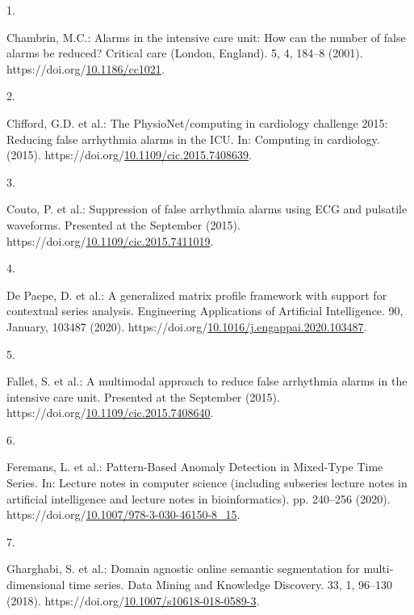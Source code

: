 \documentclass[runningheads]{llncs}
\newlength{\cslhangindent}
\newlength{\csllabelwidth}
\newenvironment{CSLReferences}[2] %
 {%
  \setlength{\parindent}{0pt}
  \ifodd #1 \everypar{\setlength{\hangindent}{\cslhangindent}}\ignorespaces\fi
  \ifnum #2 > 0
  \setlength{\parskip}{#2\baselineskip}
  \fi
 }%
 {}
\newcommand{\CSLLeftMargin}[1]{\parbox[t]{\csllabelwidth}{#1}}
\newcommand{\CSLRightInline}[1]{\parbox[t]{\linewidth - \csllabelwidth}{#1}\break}
\begin{document}
\hypertarget{refs}{}
\begin{CSLReferences}{0}{0}
\leavevmode{}%
\CSLLeftMargin{1. }
\CSLRightInline{Chambrin, M.C.: Alarms in the intensive care unit: How can the number of false alarms be reduced? Critical care (London, England). 5, 4, 184--8 (2001). https://doi.org/\href{https://doi.org/10.1186/cc1021}{10.1186/cc1021}.}

\leavevmode{}%
\CSLLeftMargin{2. }
\CSLRightInline{Clifford, G.D. et al.: The PhysioNet/computing in cardiology challenge 2015: Reducing false arrhythmia alarms in the ICU. In: Computing in cardiology. (2015). https://doi.org/\href{https://doi.org/10.1109/cic.2015.7408639}{10.1109/cic.2015.7408639}.}

\leavevmode{}%
\CSLLeftMargin{3. }
\CSLRightInline{Couto, P. et al.: Suppression of false arrhythmia alarms using ECG and pulsatile waveforms. Presented at the September (2015). https://doi.org/\href{https://doi.org/10.1109/cic.2015.7411019}{10.1109/cic.2015.7411019}.}

\leavevmode{}%
\CSLLeftMargin{4. }
\CSLRightInline{De Paepe, D. et al.: {A generalized matrix profile framework with support for contextual series analysis}. Engineering Applications of Artificial Intelligence. 90, January, 103487 (2020). https://doi.org/\href{https://doi.org/10.1016/j.engappai.2020.103487}{10.1016/j.engappai.2020.103487}.}

\leavevmode{}%
\CSLLeftMargin{5. }
\CSLRightInline{Fallet, S. et al.: A multimodal approach to reduce false arrhythmia alarms in the intensive care unit. Presented at the September (2015). https://doi.org/\href{https://doi.org/10.1109/cic.2015.7408640}{10.1109/cic.2015.7408640}.}

\leavevmode{}%
\CSLLeftMargin{6. }
\CSLRightInline{Feremans, L. et al.: {Pattern-Based Anomaly Detection in Mixed-Type Time Series}. In: Lecture notes in computer science (including subseries lecture notes in artificial intelligence and lecture notes in bioinformatics). pp. 240--256 (2020). https://doi.org/\href{https://doi.org/10.1007/978-3-030-46150-8_15}{10.1007/978-3-030-46150-8\_15}.}

\leavevmode{}%
\CSLLeftMargin{7. }
\CSLRightInline{Gharghabi, S. et al.: Domain agnostic online semantic segmentation for multi-dimensional time series. Data Mining and Knowledge Discovery. 33, 1, 96--130 (2018). https://doi.org/\href{https://doi.org/10.1007/s10618-018-0589-3}{10.1007/s10618-018-0589-3}.}


\end{CSLReferences}
\end{document}
